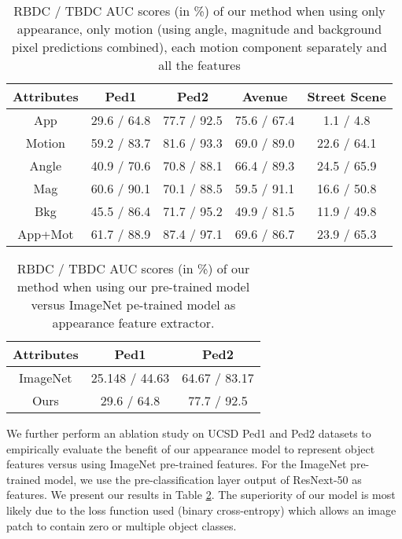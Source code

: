 \begin{table}[t]
\setlength{\tabcolsep}{1.5pt}
\centering
\begin{tabular}{| c | c | c | c | c |}
    \hline
    Attributes & Ped1 & Ped2 & Avenue & Street Scene\\
    \hline
    \hline 
     App & 29.6 / 64.8 & 77.7 / 92.5 & 75.6 / 67.4 & 1.1 / 4.8\\
     \hline
     Motion & 59.2 / 83.7 & 81.6 / 93.3 & 69.0 / 89.0 & 22.6 / 64.1\\
     \hline
     Angle &  40.9 / 70.6  &  70.8 / 88.1  &  66.4 / 89.3  &  24.5 / 65.9 \\
     \hline
     Mag &  60.6 / 90.1  &  70.1 / 88.5  &  59.5 / 91.1  & 16.6 / 50.8 \\
     \hline
     Bkg &  45.5 / 86.4  &  71.7 / 95.2  & 49.9 / 81.5  &  11.9 / 49.8 \\
     \hline
     App+Mot & 61.7 / 88.9 & 87.4 / 97.1 & 69.6 / 86.7 & 23.9 / 65.3\\
     \hline
\end{tabular}
\caption{RBDC / TBDC AUC scores (in \%) of our method when using only appearance, only motion (using angle, magnitude and background pixel predictions combined), each motion component separately and all the features}
\label{ablation1}

\end{table}

\begin{table}[t]
\setlength{\tabcolsep}{12pt}
\centering
\begin{tabular}{| c | c | c |}
    \hline
    Attributes & Ped1 & Ped2 \\
    \hline
    \hline 
     ImageNet & 25.148 / 44.63 & 64.67 / 83.17 \\
     \hline
     Ours & 29.6 / 64.8 & 77.7 / 92.5 \\
     \hline
\end{tabular}
\caption{RBDC / TBDC AUC scores (in \%) of our method when using our pre-trained model versus ImageNet pe-trained model as appearance feature extractor.}
\label{ablation2}
\vspace{-15pt}
\end{table}

We further perform an ablation study on UCSD Ped1 and Ped2 datasets to empirically evaluate the benefit of our appearance model to represent object features versus using ImageNet pre-trained features. For the ImageNet pre-trained model, we use the pre-classification layer output of ResNext-50 as features. 
We present our results in Table \ref{ablation2}. The superiority of our model is most likely due to the loss function used (binary cross-entropy) which allows an image patch to contain zero or multiple object classes.






